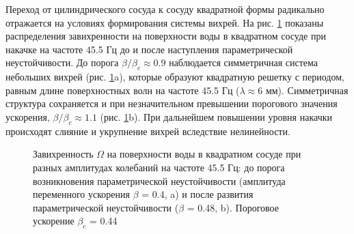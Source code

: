 Переход от цилиндрического сосуда к сосуду квадратной формы радикально отражается на условиях формирования системы вихрей. На рис. \ref{img:vort_square} показаны распределения завихренности на поверхности воды в квадратном сосуде при накачке на частоте 45.5 Гц до и после наступления параметрической неустойчивости. До порога $\beta/\beta_c \approx 0.9$ наблюдается симметричная система небольших вихрей (рис. \ref{img:vort_square}a), которые образуют квадратную решетку с периодом, равным длине поверхностных волн на частоте 45.5 Гц ($\lambda \approx 6$ мм). Симметричная структура сохраняется и при незначительном превышении порогового значения ускорения, $\beta/\beta_c \approx 1.1$ (рис. \ref{img:vort_square}b). При дальнейшем повышении уровня накачки происходят слияние и укрупнение вихрей вследствие нелинейности.

\begin{figure}[ht]
  \begin{minipage}[ht]{0.49\linewidth}
  \end{minipage}
  \hfill
  \begin{minipage}[ht]{0.49\linewidth}
  \end{minipage}
  \caption{Завихренность $\Omega$ на поверхности воды в квадратном сосуде при разных амплитудах колебаний на частоте 45.5 Гц: до порога возникновения параметрической неустойчивости (амплитуда переменного ускорения $\beta$ = 0.4, a) и после развития параметрической неустойчивости ($\beta$ = 0.48, b). Пороговое ускорение $\beta_c$ = 0.44}
  \label{img:vort_square}  
\end{figure}


